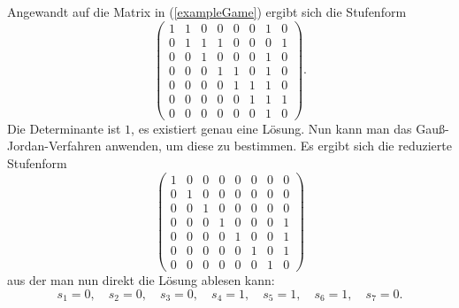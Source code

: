 \documentclass{scrartcl}
\begin{document}
Angewandt auf die Matrix in (\ref{exampleGame}) ergibt sich die Stufenform
\begin{equation}
\left(\begin{array}{ccccccc|c}
  1&1&0&0&0&0&1&0\\
  0&1&1&1&0&0&0&1\\
  0&0&1&0&0&0&1&0\\
  0&0&0&1&1&0&1&0\\
  0&0&0&0&1&1&1&0\\
  0&0&0&0&0&1&1&1\\
  0&0&0&0&0&0&1&0
\end{array}\right).
\end{equation}
Die Determinante ist $1$, es existiert genau eine Lösung. Nun kann man das
Gauß-Jordan-Verfahren anwenden, um diese zu bestimmen. Es ergibt sich die
reduzierte Stufenform
\begin{equation}
\left(\begin{array}{ccccccc|c}
  1&0&0&0&0&0&0&0\\
  0&1&0&0&0&0&0&0\\
  0&0&1&0&0&0&0&0\\
  0&0&0&1&0&0&0&1\\
  0&0&0&0&1&0&0&1\\
  0&0&0&0&0&1&0&1\\
  0&0&0&0&0&0&1&0
\end{array}\right)
\end{equation}
aus der man nun direkt die Lösung ablesen kann:
\begin{equation}
s_1 = 0,\quad
s_2 = 0,\quad
s_3 = 0,\quad
s_4 = 1,\quad
s_5 = 1,\quad
s_6 = 1,\quad
s_7 = 0.
\end{equation}
\end{document}
